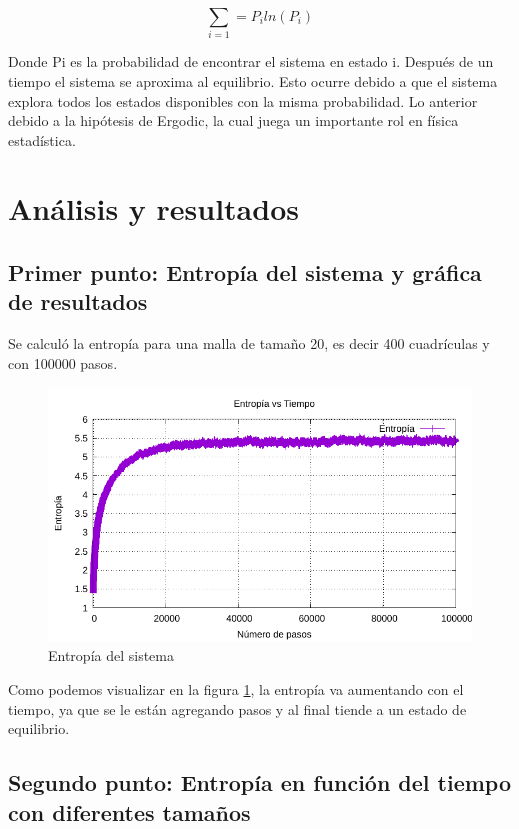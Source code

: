 \documentclass{article}
\begin{document}
\begin{multicols}{2}
\begin{equation}
        \sum_{i=1}=P_i ln(P_i)
        \label{Entropía}
\end{equation}

Donde Pi es la probabilidad de encontrar el sistema en estado i. Después de un tiempo el sistema se aproxima al equilibrio. Esto ocurre debido a que el sistema explora todos los estados disponibles con la misma probabilidad. Lo anterior debido a la hipótesis de Ergodic, la cual juega un importante rol en física estadística. 




\section*{Análisis y resultados}

\subsection*{Primer punto: Entropía del sistema y gráfica de resultados} 

Se calculó la entropía para una malla de tamaño 20, es decir 400 cuadrículas y con 100000 pasos.

\begin{figure}[H]
    \centering
    \includegraphics[width=\columnwidth]{punto_1.pdf}
    \caption{Entropía del sistema}
    \label{Entropia}
\end{figure}

Como podemos visualizar en la figura \ref{Entropia}, la entropía va aumentando con el tiempo, ya que se le están agregando pasos y al final tiende a un estado de equilibrio.



\subsection*{Segundo punto: Entropía en función del tiempo con diferentes tamaños}


\end{multicols}
\end{document}
